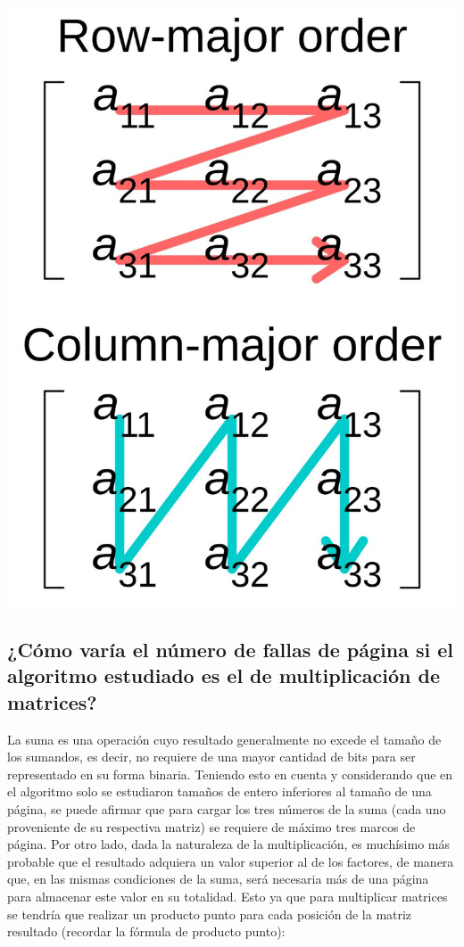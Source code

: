 \documentclass[a4paper]{article}
\begin{document}
\begin{center}
\includegraphics[scale=0.25]{cmo.jpeg}
\end{center}

\subsection{¿Cómo varía el número de fallas de página si el algoritmo 
estudiado es el de multiplicación de matrices?}
La suma es una operación cuyo resultado generalmente no excede el 
tamaño de los sumandos, es decir, no requiere de una mayor cantidad de 
bits para ser representado en su forma binaria. Teniendo esto en cuenta 
y considerando que en el algoritmo solo se estudiaron tamaños de entero 
inferiores al tamaño de una página, se puede afirmar que para cargar los 
tres números de la suma (cada uno proveniente de su respectiva matriz) 
se requiere de máximo tres marcos de página. Por otro lado, dada la 
naturaleza de la multiplicación, es muchísimo más probable que el 
resultado adquiera un valor superior al de los factores, de manera que, 
en las mismas condiciones de la suma, será necesaria más de una página 
para almacenar este valor en su totalidad. Esto ya que para multiplicar 
matrices se tendría que realizar un producto punto para cada posición 
de la matriz resultado (recordar la fórmula de producto punto):
\end{document}
